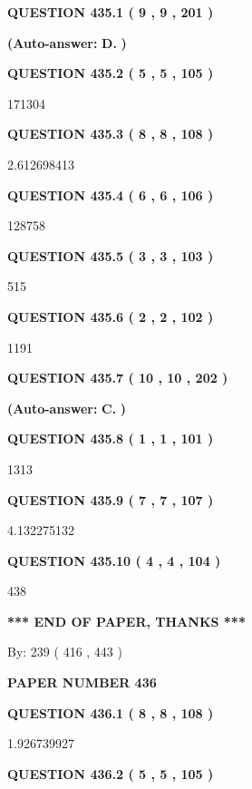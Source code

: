 \documentclass{ctexart}
\begin{document}
   
   
   
  
  
{\textbf{\large{QUESTION
435.1 
 ( 9 , 9 , 201 )
}}}
 
 
{\textbf{(Auto-answer:}}
{\textbf{\large{
D.}}}
{\textbf{)}}
 
 
  
  
{\textbf{\large{QUESTION
435.2 
 ( 5 , 5 , 105 )
}}}

171304
  
  
{\textbf{\large{QUESTION
435.3 
 ( 8 , 8 , 108 )
}}}

2.612698413
  
  
{\textbf{\large{QUESTION
435.4 
 ( 6 , 6 , 106 )
}}}

128758
  
  
{\textbf{\large{QUESTION
435.5 
 ( 3 , 3 , 103 )
}}}

515
  
  
{\textbf{\large{QUESTION
435.6 
 ( 2 , 2 , 102 )
}}}

1191
  
  
{\textbf{\large{QUESTION
435.7 
 ( 10 , 10 , 202 )
}}}
 
 
{\textbf{(Auto-answer:}}
{\textbf{\large{
C.}}}
{\textbf{)}}
 
 
  
  
{\textbf{\large{QUESTION
435.8 
 ( 1 , 1 , 101 )
}}}

1313
  
  
{\textbf{\large{QUESTION
435.9 
 ( 7 , 7 , 107 )
}}}

4.132275132
  
  
{\textbf{\large{QUESTION
435.10 
 ( 4 , 4 , 104 )
}}}

438
   
   
   
   
\vspace{1.0in} 
{\textbf{\large{ *** END OF PAPER, THANKS *** }}} 
   
   
\hspace{1.0in} By: 
 239 ( 416 ,  443 )
   
   
   
   
\newpage 
\setcounter{page}{ 
   436001 } 
   
   
 {\textbf{ \Large{ PAPER NUMBER  436  }}}
   
   
   
   
  
  
{\textbf{\large{QUESTION
436.1 
 ( 8 , 8 , 108 )
}}}

1.926739927
  
  
{\textbf{\large{QUESTION
436.2 
 ( 5 , 5 , 105 )
}}}
\end{document}
